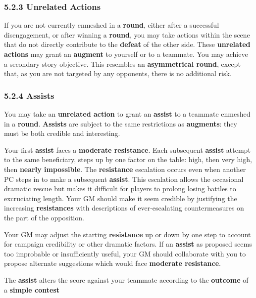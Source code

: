 \documentclass[
]{article}
\begin{document}
\hypertarget{unrelated-actions}{%
\subsubsection{5.2.3 Unrelated Actions}\label{unrelated-actions}}

If you are not currently enmeshed in a \textbf{round}, either after a
successful disengagement, or after winning a \textbf{round}, you may
take actions within the scene that do not directly contribute to the
\textbf{defeat} of the other side. These \textbf{unrelated actions} may
grant an \textbf{augment} to yourself or to a teammate. You may achieve
a secondary story objective. This resembles an \textbf{asymmetrical
round}, except that, as you are not targeted by any opponents, there is
no additional risk.

\hypertarget{assists}{%
\subsubsection{5.2.4 Assists}\label{assists}}

You may take an \textbf{unrelated action} to grant an \textbf{assist} to
a teammate enmeshed in a \textbf{round}. \textbf{Assists} are subject to
the same restrictions as \textbf{augments}: they must be both credible
and interesting.

Your first \textbf{assist} faces a \textbf{moderate resistance}. Each
subsequent \textbf{assist} attempt to the same beneficiary, steps up by
one factor on the table: high, then very high, then \textbf{nearly
impossible}. The \textbf{resistance} escalation occurs even when another
PC steps in to make a subsequent \textbf{assist}. This escalation allows
the occasional dramatic rescue but makes it difficult for players to
prolong losing battles to excruciating length. Your GM should make it
seem credible by justifying the increasing \textbf{resistances} with
descriptions of ever-escalating countermeasures on the part of the
opposition.

Your GM may adjust the starting \textbf{resistance} up or down by one
step to account for campaign credibility or other dramatic factors. If
an \textbf{assist} as proposed seems too improbable or insufficiently
useful, your GM should collaborate with you to propose alternate
suggestions which would face \textbf{moderate resistance}.

The \textbf{assist} alters the score against your teammate according to
the \textbf{outcome} of a \textbf{simple contest}
\end{document}
